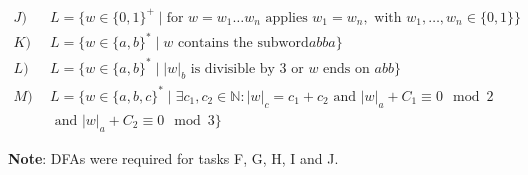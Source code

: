\documentclass{article}
\begin{document}
\begin{align*}
    J) \ \ & L = \{ w \in \{0, 1\}^+ \mid \text{for } w=w_1 \dots w_n \text{ applies } w_1 = w_n, \text{ with } w_1, \dots, w_n \in \{0, 1\}\}\\
    K) \ \ & L = \{ w \in \{a, b\}^* \mid w \text{ contains the subword} abba \}\\
    L) \ \ & L = \{ w \in \{a, b\}^* \mid |w|_b \text{ is divisible by 3 or }  w \text{ ends on } abb \} \\
    M) \ \ & L = \{ w \in \{a, b, c\}^* \mid \exists c_1, c_2 \in \mathbb{N}: |w|_c = c_1 + c_2 \text{ and } |w|_a + C_1 \equiv 0 \mod 2 \\
    & \text{ and } |w|_a + C_2 \equiv 0 \mod 3 \}
\end{align*}

\textbf{Note}: DFAs were required for tasks F, G, H, I and J.
\end{document}
